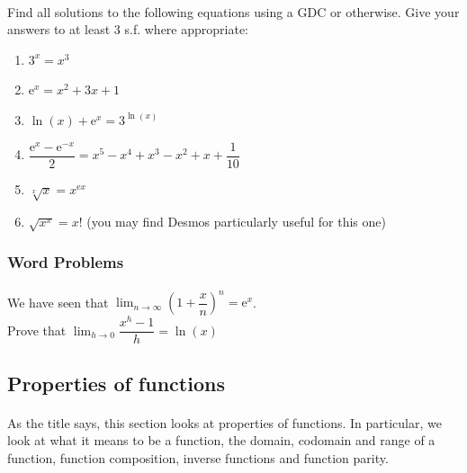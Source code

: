 \documentclass[12pt, a4paper, titlepage, twoside]{article}
\newcommand*{\e}{\textrm{e}}
\begin{document}
	\paragraph{}
	 Find all solutions to the following equations using a GDC or otherwise.
	Give your answers to at least 3 s.f. where appropriate:
	
	\begin{multicols}{2}
		\begin{enumerate}[label=\textbf{(\alph*)}]
			\item $3^x = x^3$ 
			\item $\e^x = x^2 + 3x + 1$
			\item $\ln(x) + \e^x = 3^{\ln(x)}$
			\item $\dfrac{\e^x - \e^{-x}}{2} = x^5-x^4+x^3-x^2+x+\dfrac{1}{10}$
			\item $\sqrt[x]{x} = x^{\e x}$
			\item $\sqrt{x^x} = x!$ (you may find Desmos particularly useful for this one)
		\end{enumerate}
	\end{multicols}
	
	\hfill
	
	\subsubsection*{Word Problems}
	
	\paragraph{}
	 We have seen that $\displaystyle \lim_{n \to \infty} \left(1+\dfrac{x}{n}\right)^n = \e^x$.\\
	Prove that $\displaystyle \lim_{h \to 0} \dfrac{x^h - 1}{h} = \ln(x)$
	
	\hfill
	
	\subsection{Properties of functions}
	
	\paragraph{}
	As the title says, this section looks at properties of functions. In particular, we look at what it means to be a function, the domain, codomain
	and range of a function, function composition, inverse functions and function parity.
	
\end{document}
